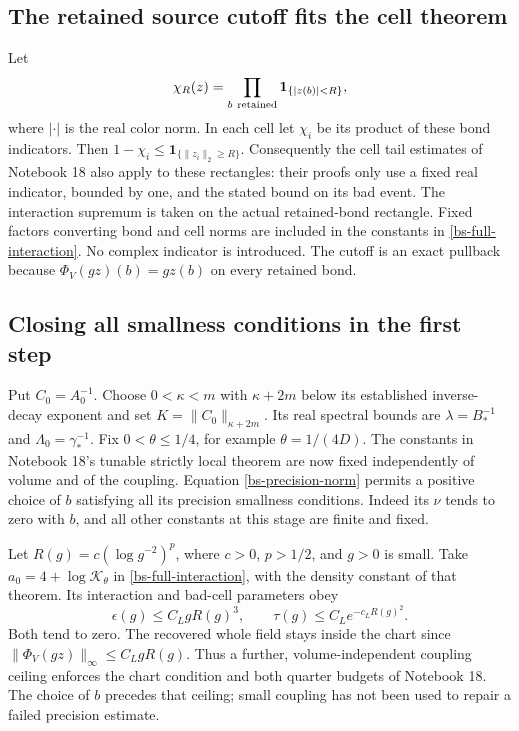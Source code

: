 \documentclass[11pt]{article}
\theoremstyle{remark}
\begin{document}
\subsection{The retained source cutoff fits the cell theorem}

Let
\begin{equation}\label{bs-cutoff}
 \chi_R(z)=\prod_{b\ {\rm retained}}\mathbf1_{\{|z(b)|<R\}},
\end{equation}
where $|\cdot|$ is the real color norm. In each cell let $\chi_i$
be its product of these bond indicators. Then
$1-\chi_i\le\mathbf1_{\{\|z_i\|_2\ge R\}}$.
Consequently the cell tail estimates of Notebook 18 also apply
to these rectangles: their proofs only use a fixed real
indicator, bounded by one, and the stated bound on its bad
event. The interaction supremum is taken on the actual
retained-bond rectangle. Fixed factors converting bond and
cell norms are included in the constants in
\eqref{bs-full-interaction}. No complex indicator is introduced.
The cutoff is an exact pullback because
$\Phi_V(gz)(b)=gz(b)$ on every retained bond.

\subsection{Closing all smallness conditions in the first step}

Put $C_0=A_0^{-1}$. Choose $0<\kappa<m$ with
$\kappa+2m$ below its established inverse-decay exponent and
set $K=\|C_0\|_{\kappa+2m}$. Its real spectral bounds are
$\lambda=B_*^{-1}$ and $\Lambda_0=\gamma_*^{-1}$.
Fix $0<\theta\le1/4$, for example $\theta=1/(4D)$.
The constants in Notebook 18's tunable strictly local theorem
are now fixed independently of volume and of the coupling.
Equation \eqref{bs-precision-norm} permits a positive choice
of $b$ satisfying all its precision smallness conditions.
Indeed its $\nu$ tends to zero with $b$, and all other
constants at this stage are finite and fixed.

Let $R(g)=c(\log g^{-2})^p$, where $c>0$, $p>1/2$,
and $g>0$ is small. Take $a_0=4+\log\mathcal K_\theta$
in \eqref{bs-full-interaction}, with the density constant of
that theorem. Its interaction and bad-cell parameters obey
\begin{equation}\label{bs-parameters}
 \epsilon(g)\le C_LgR(g)^3,\qquad
 \tau(g)\le C_L e^{-c_LR(g)^2}.
\end{equation}
Both tend to zero. The recovered whole field stays inside
the chart since $\|\Phi_V(gz)\|_\infty\le C_LgR(g)$.
Thus a further, volume-independent coupling ceiling enforces
the chart condition and both quarter budgets of Notebook 18.
The choice of $b$ precedes that ceiling; small coupling has
not been used to repair a failed precision estimate.
\end{document}
